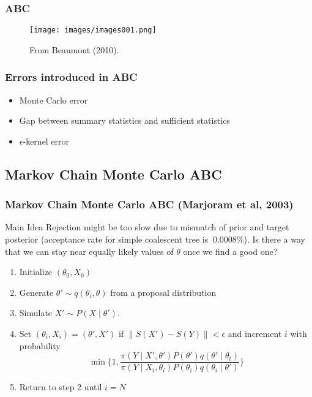 \documentclass{beamer}
\begin{document}

\begin{frame}
\frametitle{ABC}
\begin{figure}
\texttt{[image: images/images001.png]}
\caption{From Beaumont (2010).}
\end{figure}
\end{frame}


\begin{frame}
\frametitle{Errors introduced in ABC}
\begin{itemize}
\item Monte Carlo error
\item Gap between summary statistics and sufficient statistics
\item $\epsilon$-kernel error
\end{itemize}
\end{frame}


\subsection{Markov Chain Monte Carlo ABC}
\begin{frame}
\frametitle{Markov Chain Monte Carlo ABC (Marjoram et al, 2003)}
\begin{block}{Main Idea}
Rejection might be too slow due to mismatch of prior and target posterior (acceptance rate for simple coalescent tree is \alert{$~0.0008\%$}). Is there a way that we can stay near equally likely values of $\theta$ once we find a good one?
\end{block}
\pause
\begin{enumerate}
\item Initialize $(\theta_0, X_0)$
\item Generate $\theta' \sim q(\theta_i, \theta)$ from a proposal distribution
\item Simulate $X' \sim P(X \mid \theta')$.
\item Set $(\theta_i, X_i) = (\theta', X')$ if $\|S(X') - S(Y)\| < \epsilon$ and increment $i$ with probability
$$\min \{1, \frac{\pi(Y \mid X', \theta') P(\theta') q(\theta' \mid \theta_t)}{\pi(Y \mid X_i, \theta_i) P(\theta_i) q(\theta_i \mid \theta')} \}$$
\item Return to step 2 until $i = N$
\end{enumerate}
\end{frame}
\end{document}
